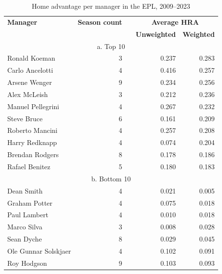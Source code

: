 \begin{table}[htbp]
    \begin{spacing}{1.5}
    \small
    \centering
    \caption{Home advantage per manager in the EPL, 2009--2023}
    \label{tab:hra_per_manager}
    \begin{tabular}{lrrrr}
        \toprule
        \toprule
        \textbf{Manager} & \multicolumn{1}{l}{\textbf{Season count}} &       & \multicolumn{2}{c}{\textbf{Average HRA}} \\
        \cmidrule{4-5}          &       &       & \multicolumn{1}{l}{\textbf{Unweighted}} & \multicolumn{1}{l}{\textbf{Weighted}} \\
        \midrule
        \multicolumn{5}{c}{a. Top 10} \\
        \midrule
        Ronald Koeman & 3     &       & 0.237 & 0.283 \\
        Carlo Ancelotti & 4     &       & 0.416 & 0.257 \\
        Arsene Wenger & 9     &       & 0.234 & 0.256 \\
        Alex McLeish & 3     &       & 0.212 & 0.236 \\
        Manuel Pellegrini & 4     &       & 0.267 & 0.232 \\
        Steve Bruce & 6     &       & 0.161 & 0.209 \\
        Roberto Mancini & 4     &       & 0.257 & 0.208 \\
        Harry Redknapp & 4     &       & 0.074 & 0.204 \\
        Brendan Rodgers & 8     &       & 0.178 & 0.186 \\
        Rafael Benitez & 5     &       & 0.180 & 0.183 \\
        \midrule
        \multicolumn{5}{c}{b. Bottom 10} \\
        \midrule
        Dean Smith & 4     &       & 0.021 & 0.005 \\
        Graham Potter & 4     &       & 0.075 & 0.018 \\
        Paul Lambert & 4     &       & 0.010 & 0.018 \\
        Marco Silva & 3     &       & 0.008 & 0.028 \\
        Sean Dyche & 8     &       & 0.029 & 0.045 \\
        Ole Gunnar Solskjaer & 4     &       & 0.102 & 0.091 \\
        Roy Hodgson & 9     &       & 0.103 & 0.093 \\

\end{tabular}
\end{spacing}
\end{table}
